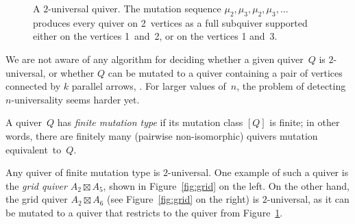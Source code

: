 \begin{figure}[ht]\centering
{}

\caption{A $2$-universal quiver. The mutation sequence $\mu_2,\mu_3,\mu_2,\mu_3,...$ produces every quiver on 2~vertices as a full subquiver supported either on the vertices 1~and~2, or on the vertices 1 and~3.}\label{fig:2-universal-quiver}
\end{figure}

\begin{remark}
We are not aware of any algorithm for deciding whether a given quiver~$Q$ is $2$-universal, or whether $Q$ can be mutated to a quiver containing a pair of vertices connected by $k$ parallel arrows, \cf \cite[Remark~4.1.13]{FWZ}. For larger values of~$n$, the problem of detecting $n$-universality seems harder yet. 
\end{remark}

A quiver~$Q$ has \emph{finite mutation type} if its mutation class $[Q]$ is finite; in other words, there are finitely many (pairwise non-isomorphic) quivers mutation equivalent~to~$Q$. 

\begin{example}
\label{example:grid-quivers}
Any quiver of finite mutation type is  $2$-universal. One example of such a quiver is the \emph{grid quiver} $A_2\boxtimes A_5$, shown in Figure~\ref{fig:grid} on the left. On the other hand, the grid quiver $A_2\boxtimes A_6$ (see Figure~\ref{fig:grid} on the right) is $2$-universal, as it can be mutated to a quiver that restricts to the quiver from Figure~\ref{fig:2-universal-quiver}. 
\end{example}

